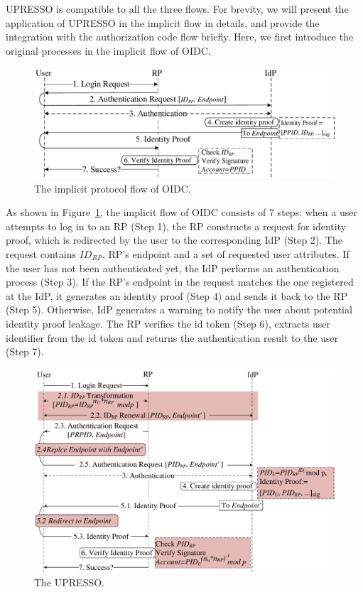 UPRESSO is compatible to all the three flows.
For brevity, we will present the application of UPRESSO in the implicit flow in details, and provide the integration with the authorization code flow briefly. 
Here, we first introduce the original processes in the implicit flow of OIDC.
\begin{figure}[t]
  \centering
  \includegraphics[width=\linewidth]{fig/OIDC1.pdf}
  \caption{The implicit protocol flow of OIDC.}
  \label{fig:OpenID}
\end{figure}
As shown in Figure~\ref{fig:OpenID}, the implicit flow of OIDC consists of 7 steps: when a user attempts to log in to an RP (Step 1), the RP constructs a request for identity proof, which is redirected by the user to the corresponding IdP (Step 2). The request contains $ID_{RP}$, RP's endpoint and a set of requested user attributes. If the user has not been authenticated yet, the IdP performs an authentication process (Step 3). If the RP's endpoint in the request matches the one registered at the IdP, it generates an identity proof (Step 4) and sends it back to the RP (Step 5). Otherwise, IdP generates a warning to notify the user about potential identity proof leakage. The RP verifies the id token (Step 6), extracts user identifier from the id token and returns the authentication result to the user (Step 7).



\begin{figure}[t]
  \centering
  \includegraphics[width=\linewidth]{fig/overview1.pdf}
  \caption{The UPRESSO.}
  \label{fig:UPRESSO}
\end{figure}

